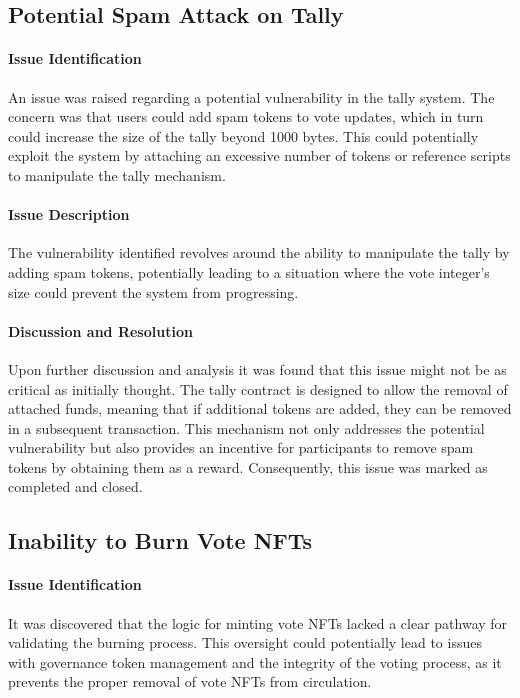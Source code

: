 \documentclass[11pt]{article}
\begin{document}
\subsection{Potential Spam Attack on Tally}

\paragraph{Issue Identification}
An issue was raised regarding a potential vulnerability in the tally system.
The concern was that users could add spam tokens to vote updates, which in turn could increase the size of the tally beyond 1000 bytes.
This could potentially exploit the system by attaching an excessive number of tokens or reference scripts to manipulate the tally mechanism.

\paragraph{Issue Description}
The vulnerability identified revolves around the ability to manipulate the tally by adding spam tokens, potentially leading to a situation where the vote integer's size could prevent the system from progressing.

\paragraph{Discussion and Resolution}
Upon further discussion and analysis it was found that this issue might not be as critical as initially thought.
The tally contract is designed to allow the removal of attached funds, meaning that if additional tokens are added, they can be removed in a subsequent transaction.
This mechanism not only addresses the potential vulnerability but also provides an incentive for participants to remove spam tokens by obtaining them as a reward.
Consequently, this issue was marked as completed and closed.

\subsection{Inability to Burn Vote NFTs}

\paragraph{Issue Identification}
It was discovered that the logic for minting vote NFTs lacked a clear pathway for validating the burning process.
This oversight could potentially lead to issues with governance token management and the integrity of the voting process, as it prevents the proper removal of vote NFTs from circulation.
\end{document}
